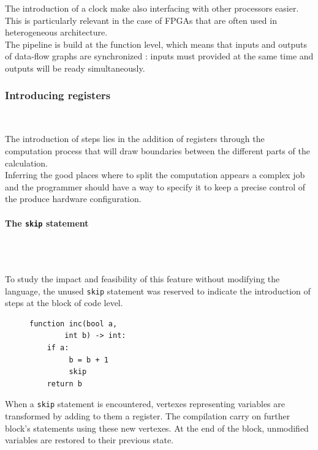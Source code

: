 \documentclass[10pt,a4paper]{article}
\renewcommand{\indent}{~\\\vspace{-.8cm}}
\newcommand{\pindent}{~\\\indent}
\newcommand{\whileyLine}{\lstinline[language=Whiley,basicstyle=\normalsize\ttfamily]}
\begin{document}
The introduction of a clock make also interfacing with other processors easier. This is particularly relevant in the case of FPGAs that are often used in heterogeneous architecture.\\

The pipeline is build at the function level, which means that inputs and outputs of data-flow graphs are synchronized : inputs must provided at the same time and outputs will be ready simultaneously.



\subsubsection{Introducing registers}
\indent


The introduction of steps lies in the addition of registers through the computation process that will draw boundaries between the different parts of the calculation. \\

Inferring the good places where to split the computation appears a complex job and the programmer should have a way to specify it to keep a precise control of the produce hardware configuration. 


\paragraph{The \whileyLine{skip} statement} \pindent

To study the impact and feasibility of this feature without modifying the language, the unused \whileyLine{skip} statement was reserved to indicate the introduction of steps at the block of code level.\\



\begin{figure}
\vspace{-20pt}
\begin{lstlisting}[language=Whiley, frame=single, showlines=true]
function inc(bool a,
        int b) -> int:
    if a:
         b = b + 1
         skip
    return b
\end{lstlisting}
\end{figure}

When a \whileyLine{skip} statement is encountered, vertexes representing variables are transformed by adding to them a register. The compilation carry on further block's statements using these new vertexes. At the end of the block, unmodified variables are restored to their previous state.
\end{document}
